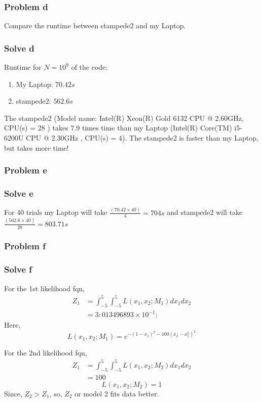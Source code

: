 \documentclass{article}
\begin{document}
\subsubsection*{Problem d}
Compare the runtime between stampede2 and my Laptop.
\subsubsection*{Solve d}
Runtime for $N = 10^9$ of the code:
\begin{enumerate}
    \item My Laptop: $70.42s$
    \item stampede2: $562.6s$
\end{enumerate}
The stampede2 (Model name: Intel(R) Xeon(R) Gold 6132 CPU @ 2.60GHz, CPU(s) = 28
) takes 7.9 times time than my Laptop (Intel(R) Core(TM) i5-6200U CPU @ 2.30GHz
, CPU(s) = 4). The stampede2 is faster than my Laptop, but takes more time!

\subsubsection*{Problem e}
\subsubsection*{Solve e}
For 40 trials my Laptop will take $\frac{(70.42\times 40)}{4} = 704s $ and stampede2 will take
$\frac{(562.6\times 40)}{28} = 803.71s $
\subsubsection*{Problem f}
\subsubsection*{Solve f}
For the 1st likelihood fqn,
\begin{equation*}
    \begin{split}
        Z_1 & = \int_{-5}^{5}\int_{-5}^{5}L(x_1,x_2;M_1)dx_1dx_2 \\
        & = 3:013496893\times 10^{-1};
    \end{split}
\end{equation*}
Here,
\begin{equation*}
    L(x_1,x_2;M_1) = e^{-(1-x_1)^2 - 100(x_2-x_1^2)^2}
    \label{m1}
\end{equation*}

For the 2nd likelihood fqn,
\begin{equation*}
\begin{split}
    Z_1 & = \int_{-5}^{5}\int_{-5}^{5}L(x_1,x_2;M_2)dx_1 dx_2 
    \\
    & = 100
  \end{split}
\end{equation*}
\begin{equation*}
    L(x_1,x_2;M_2) = 1
    \label{m1}
\end{equation*}
Since, $Z_2 > Z_1$, so, $Z_2$ or model 2 fits data better.
\end{document}

